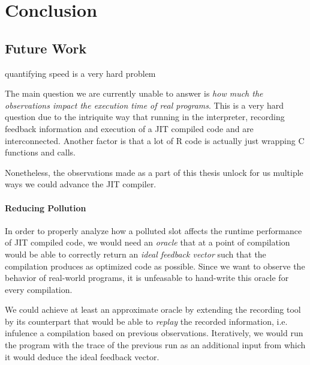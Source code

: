 \chapter*{Conclusion}

\section{Future Work}

quantifying speed is a very hard problem

The main question we are currently unable to answer is \textit{how much the observations impact the execution time of real programs}. This is a very hard question due to the intriquite way that running in the interpreter, recording feedback information and execution of a JIT compiled code and are interconnected. Another factor is that a lot of R code is actually just wrapping C functions and calls.

Nonetheless, the observations made as a part of this thesis unlock for us multiple ways we could advance the JIT compiler.

\subsubsection*{Reducing Pollution}

In order to properly analyze how a polluted slot affects the runtime performance of JIT compiled code, we would need an \textit{oracle} that at a point of compilation would be able to correctly return an \textit{ideal feedback vector} such that the compilation produces as optimized code as possible. Since we want to observe the behavior of real-world programs, it is unfeasable to hand-write this oracle for every compilation.

We could achieve at least an approximate oracle by extending the recording tool by its counterpart that would be able to \textit{replay} the recorded information, i.e. infulence a compilation based on previous observations. Iteratively, we would run the program with the trace of the previous run as an additional input from which it would deduce the ideal feedback vector.


